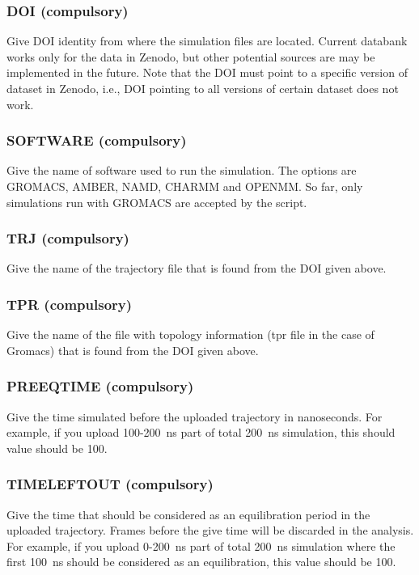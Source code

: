 \documentclass[fleqn,10pt]{wlscirep}
\begin{document}
\subsubsection*{DOI (compulsory)}
Give DOI identity from where the simulation files are located. Current databank works only for the data in Zenodo, but other potential sources are may be implemented in the future. Note that the DOI must point to a specific version of dataset in Zenodo, i.e., DOI pointing to all versions of certain dataset does not work.

\subsubsection*{SOFTWARE (compulsory)}
Give the name of software used to run the simulation. The options are GROMACS, AMBER, NAMD, CHARMM and OPENMM. So far, only simulations run with GROMACS are accepted by the script.

\subsubsection*{TRJ (compulsory)}
Give the name of the trajectory file that is found from the DOI given above.

\subsubsection*{TPR (compulsory)}
Give the name of the file with topology information (tpr file in the case of Gromacs) that is found from the DOI given above.

\subsubsection*{PREEQTIME (compulsory)}
Give the time simulated before the uploaded trajectory in nanoseconds. For example, if you upload 100-200~ns part of total 200~ns simulation, this should value should be 100.

\subsubsection*{TIMELEFTOUT (compulsory)}
Give the time that should be considered as an equilibration period in the uploaded trajectory. Frames before the give time will be discarded in the analysis. For example, if you upload 0-200~ns part of total 200~ns simulation where the first 100~ns should be considered as an equilibration, this value should be 100.
\end{document}

